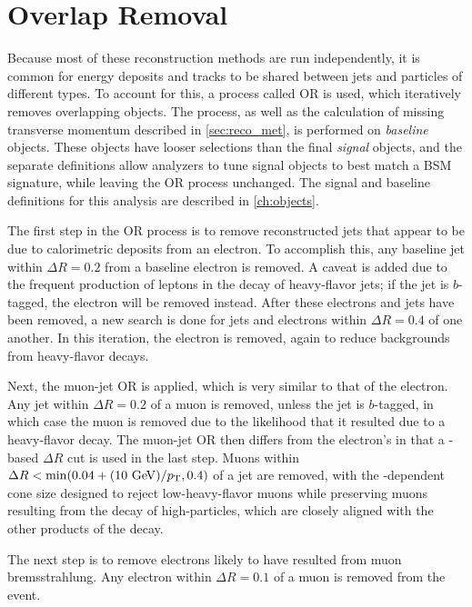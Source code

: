 \section{Overlap Removal}
\label{sec:reco_or}

Because most of these reconstruction methods are run independently, it is common for energy deposits and tracks to be shared between jets and particles of different types. To account for this, a process called \acf{OR} is used, which iteratively removes overlapping objects. The process, as well as the calculation of missing transverse momentum described in \autoref{sec:reco_met}, is performed on \textit{baseline} objects. These objects have looser selections than the final \textit{signal} objects, and the separate definitions allow analyzers to tune signal objects to best match a \ac{BSM} signature, while leaving the \ac{OR} process unchanged. The signal and baseline definitions for this analysis are described in \autoref{ch:objects}.

The first step in the \ac{OR} process is to remove reconstructed jets that appear to be due to calorimetric deposits from an electron. To accomplish this, any baseline jet within $\Delta R = 0.2$ from a baseline electron is removed. A caveat is added due to the frequent production of leptons in the decay of heavy-flavor jets; if the jet is $b$-tagged, the electron will be removed instead. After these electrons and jets have been removed, a new search is done for jets and electrons within $\Delta R = 0.4$ of one another. In this iteration, the electron is removed, again to reduce backgrounds from heavy-flavor decays.

Next, the muon-jet \ac{OR} is applied, which is very similar to that of the electron. Any jet within $\Delta R = 0.2$ of a muon is removed, unless the jet is $b$-tagged, in which case the muon is removed due to the likelihood that it resulted due to a heavy-flavor decay. The muon-jet \ac{OR} then differs from the electron's in that a \pt-based $\Delta R$ cut is used in the last step. Muons within $\Delta R < \mathrm{min}(0.04 + (10 \gev)/\pt, 0.4)$ of a jet are removed, with the \pt-dependent cone size designed to reject low-\pt heavy-flavor muons while preserving muons resulting from the decay of high-\pt particles, which are closely aligned with the other products of the decay. 

The next step is to remove electrons likely to have resulted from muon bremsstrahlung. Any electron within $\Delta R = 0.1$ of a muon is removed from the event. 

